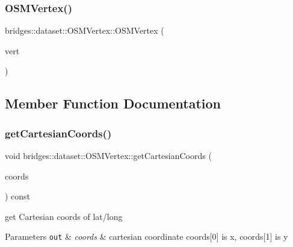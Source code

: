 \subsubsection{\texorpdfstring{O\+S\+M\+Vertex()}{OSMVertex()}\hspace{0.1cm}{\footnotesize\ttfamily [3/3]}}
{\footnotesize\ttfamily bridges\+::dataset\+::\+O\+S\+M\+Vertex\+::\+O\+S\+M\+Vertex (\begin{DoxyParamCaption}\item[{const \hyperlink{classbridges_1_1dataset_1_1_o_s_m_vertex}{O\+S\+M\+Vertex} $\ast$}]{vert }\end{DoxyParamCaption})\hspace{0.3cm}{\ttfamily [inline]}}



\subsection{Member Function Documentation}
\mbox{\label{classbridges_1_1dataset_1_1_o_s_m_vertex_a0151ea438e8265b184a91c9591aa8a12}} 
\subsubsection{\texorpdfstring{get\+Cartesian\+Coords()}{getCartesianCoords()}}
{\footnotesize\ttfamily void bridges\+::dataset\+::\+O\+S\+M\+Vertex\+::get\+Cartesian\+Coords (\begin{DoxyParamCaption}\item[{double $\ast$}]{coords }\end{DoxyParamCaption}) const\hspace{0.3cm}{\ttfamily [inline]}}

get Cartesian coords of lat/long


\begin{DoxyParams}[1]{Parameters}
\mbox{\tt out}  & {\em coords} & cartesian coordinate coords\mbox{[}0\mbox{]} is x, coords\mbox{[}1\mbox{]} is y \\
\hline
\end{DoxyParams}
\mbox{\label{classbridges_1_1dataset_1_1_o_s_m_vertex_a1f41a5f01d68747ee04b5c5eaa629c6e}} 
